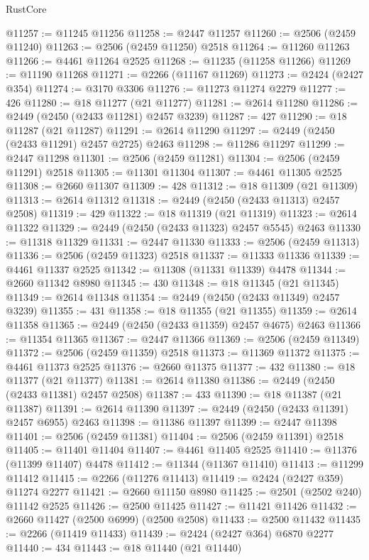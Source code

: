 \begin{lexlean}{RustCore}
\begin{coremodule}
@11257 := @11245 @11256
@11258 := @2447 @11257
@11260 := @2506 (@2459 @11240)
@11263 := @2506 (@2459 @11250) @2518
@11264 := @11260 @11263
@11266 := @4461 @11264 @2525
@11268 := @11235 (@11258 @11266)
@11269 := @11190 @11268
@11271 := @2266 (@11167 @11269)
@11273 := @2424 (@2427 @354)
@11274 := @3170 @3306
@11276 := @11273 @11274 @2279
@11277 := 426
@11280 := @18 @11277 (@21 @11277)
@11281 := @2614 @11280
@11286 := @2449 (@2450 (@2433 @11281) @2457 @3239)
@11287 := 427
@11290 := @18 @11287 (@21 @11287)
@11291 := @2614 @11290
@11297 := @2449 (@2450 (@2433 @11291) @2457 @2725) @2463
@11298 := @11286 @11297
@11299 := @2447 @11298
@11301 := @2506 (@2459 @11281)
@11304 := @2506 (@2459 @11291) @2518
@11305 := @11301 @11304
@11307 := @4461 @11305 @2525
@11308 := @2660 @11307
@11309 := 428
@11312 := @18 @11309 (@21 @11309)
@11313 := @2614 @11312
@11318 := @2449 (@2450 (@2433 @11313) @2457 @2508)
@11319 := 429
@11322 := @18 @11319 (@21 @11319)
@11323 := @2614 @11322
@11329 := @2449 (@2450 (@2433 @11323) @2457 @5545) @2463
@11330 := @11318 @11329
@11331 := @2447 @11330
@11333 := @2506 (@2459 @11313)
@11336 := @2506 (@2459 @11323) @2518
@11337 := @11333 @11336
@11339 := @4461 @11337 @2525
@11342 := @11308 (@11331 @11339) @4478
@11344 := @2660 @11342 @8980
@11345 := 430
@11348 := @18 @11345 (@21 @11345)
@11349 := @2614 @11348
@11354 := @2449 (@2450 (@2433 @11349) @2457 @3239)
@11355 := 431
@11358 := @18 @11355 (@21 @11355)
@11359 := @2614 @11358
@11365 := @2449 (@2450 (@2433 @11359) @2457 @4675) @2463
@11366 := @11354 @11365
@11367 := @2447 @11366
@11369 := @2506 (@2459 @11349)
@11372 := @2506 (@2459 @11359) @2518
@11373 := @11369 @11372
@11375 := @4461 @11373 @2525
@11376 := @2660 @11375
@11377 := 432
@11380 := @18 @11377 (@21 @11377)
@11381 := @2614 @11380
@11386 := @2449 (@2450 (@2433 @11381) @2457 @2508)
@11387 := 433
@11390 := @18 @11387 (@21 @11387)
@11391 := @2614 @11390
@11397 := @2449 (@2450 (@2433 @11391) @2457 @6955) @2463
@11398 := @11386 @11397
@11399 := @2447 @11398
@11401 := @2506 (@2459 @11381)
@11404 := @2506 (@2459 @11391) @2518
@11405 := @11401 @11404
@11407 := @4461 @11405 @2525
@11410 := @11376 (@11399 @11407) @4478
@11412 := @11344 (@11367 @11410)
@11413 := @11299 @11412
@11415 := @2266 (@11276 @11413)
@11419 := @2424 (@2427 @359) @11274 @2277
@11421 := @2660 @11150 @8980
@11425 := @2501 (@2502 @240) @11142 @2525
@11426 := @2500 @11425
@11427 := @11421 @11426
@11432 := @2660 @11427 (@2500 @6999) (@2500 @2508)
@11433 := @2500 @11432
@11435 := @2266 (@11419 @11433)
@11439 := @2424 (@2427 @364) @6870 @2277
@11440 := 434
@11443 := @18 @11440 (@21 @11440)

\end{coremodule}
\end{lexlean}
